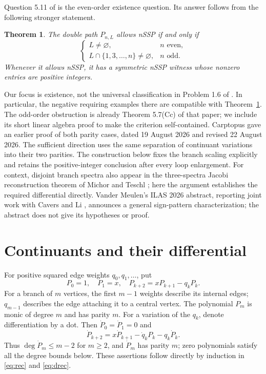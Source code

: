 \documentclass[11pt]{article}
\newtheorem{theorem}{Theorem}
\begin{document}
Question 5.11 of \cite{KO} is the even-order existence question.
Its answer follows from the following stronger statement.
\begin{theorem}\label{thm:main}
The double path $P_{n,L}$ allows nSSP if and only if
\[
 \begin{cases}
 L\ne\varnothing,&n\text{ even},\\
 L\cap\{1,3,\ldots,n\}\ne\varnothing,&n\text{ odd}.
 \end{cases}
\]
Whenever it allows nSSP, it has a symmetric nSSP witness whose nonzero
entries are positive integers.
\end{theorem}
Our focus is existence, not the universal classification in Problem 1.6
of \cite{KO}. In particular, the negative requiring examples there
are compatible with Theorem~\ref{thm:main}. The odd-order obstruction
is already Theorem 5.7(Cc) of that paper; we include its short linear
algebra proof to make the criterion self-contained.
Carptopus \cite[Theorems 4.1, 5.2 and 6.1]{C} gave an earlier proof of
both parity cases, dated 19 August 2026 and revised 22 August 2026.
The sufficient direction uses the same separation of continuant
variations into their two parities. The construction below fixes the
branch scaling explicitly and retains the positive-integer conclusion
after every loop enlargement. For context, disjoint branch spectra also
appear in the three-spectra Jacobi reconstruction theorem of
Michor and Teschl \cite[Theorem 2.1]{MT}; here the argument establishes
the required differential directly.
Vander Meulen's ILAS 2026 abstract, reporting joint work with Cavers
and Li \cite[p.~71]{VM}, announces a general sign-pattern
characterization; the abstract does not give its hypotheses or proof.

\section{Continuants and their differential}
For positive squared edge weights $q_0,q_1,\ldots$, put
\begin{equation}\label{eq:rec}
 P_0=1,\quad P_1=x,\quad
 P_{k+2}=xP_{k+1}-q_kP_k.
\end{equation}
For a branch of $m$ vertices, the first $m-1$ weights describe its
internal edges; $q_{m-1}$ describes the edge attaching it to a central
vertex. The polynomial $P_m$ is monic of degree $m$ and has parity $m$.
For a variation of the $q_k$, denote differentiation by a dot. Then
$\dot P_0=\dot P_1=0$ and
\begin{equation}\label{eq:drec}
 \dot P_{k+2}=x\dot P_{k+1}-\dot q_kP_k-q_k\dot P_k.
\end{equation}
Thus $\deg\dot P_m\leq m-2$ for $m\geq2$, and $\dot P_m$ has parity
$m$; zero polynomials satisfy all the degree bounds below.
These assertions follow directly by induction in \eqref{eq:rec}
and \eqref{eq:drec}.
\end{document}
